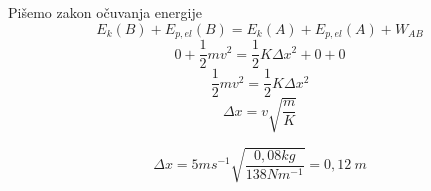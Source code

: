 

Pišemo zakon očuvanja energije
$$ E_k(B) + E_{p,el}(B)  = E_k(A) + E_{p,el}(A) + W_{AB}$$
$$ 0 + \frac{1}{2}mv^2= \frac{1}{2}K\Delta x^2 + 0 + 0$$
$$ \frac{1}{2}mv^2= \frac{1}{2}K\Delta x^2$$
$$ \Delta x=v\sqrt{\frac{m}{K}} $$

$$ \Delta x = 5 ms^{-1} \sqrt{\frac{0,08 kg}{138Nm^{-1}}}=0,12\ m $$
